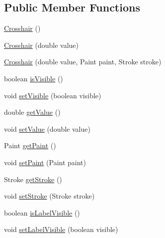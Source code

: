 \subsection*{Public Member Functions}
\begin{DoxyCompactItemize}
\item 
\mbox{\hyperlink{classorg_1_1jfree_1_1chart_1_1plot_1_1_crosshair_aec4cdb9ad9a929da083db1c1204e1cf8}{Crosshair}} ()
\item 
\mbox{\hyperlink{classorg_1_1jfree_1_1chart_1_1plot_1_1_crosshair_a75d72d1f061986df90c3a39cb1526309}{Crosshair}} (double value)
\item 
\mbox{\hyperlink{classorg_1_1jfree_1_1chart_1_1plot_1_1_crosshair_ac8ccc362ca329a1ff52f3f858b416de3}{Crosshair}} (double value, Paint paint, Stroke stroke)
\item 
boolean \mbox{\hyperlink{classorg_1_1jfree_1_1chart_1_1plot_1_1_crosshair_aebe636459c5fdca37f13bedfd0a070f8}{is\+Visible}} ()
\item 
void \mbox{\hyperlink{classorg_1_1jfree_1_1chart_1_1plot_1_1_crosshair_aa51f9dff848ea3bc68eb000379f41bd3}{set\+Visible}} (boolean visible)
\item 
double \mbox{\hyperlink{classorg_1_1jfree_1_1chart_1_1plot_1_1_crosshair_aa27be6dd0ed5c8fdf98c00a2e34c98e0}{get\+Value}} ()
\item 
void \mbox{\hyperlink{classorg_1_1jfree_1_1chart_1_1plot_1_1_crosshair_a8f53f7fe5b2f9f7ad0846a6b5f218079}{set\+Value}} (double value)
\item 
Paint \mbox{\hyperlink{classorg_1_1jfree_1_1chart_1_1plot_1_1_crosshair_a95c5923d9ef143cea6cdd735d43f420a}{get\+Paint}} ()
\item 
void \mbox{\hyperlink{classorg_1_1jfree_1_1chart_1_1plot_1_1_crosshair_a941b74a54828b6864ffd2557fcdc9ecd}{set\+Paint}} (Paint paint)
\item 
Stroke \mbox{\hyperlink{classorg_1_1jfree_1_1chart_1_1plot_1_1_crosshair_a41dcb9cd8c65d0630b74cd1488d0c4fd}{get\+Stroke}} ()
\item 
void \mbox{\hyperlink{classorg_1_1jfree_1_1chart_1_1plot_1_1_crosshair_afa44c3954b377eea8f5df66affefc242}{set\+Stroke}} (Stroke stroke)
\item 
boolean \mbox{\hyperlink{classorg_1_1jfree_1_1chart_1_1plot_1_1_crosshair_a57d3fed41cf715e092ccee249b19ee12}{is\+Label\+Visible}} ()
\item 
void \mbox{\hyperlink{classorg_1_1jfree_1_1chart_1_1plot_1_1_crosshair_ad7c7a7056ae228ddc663c8c7a64cedf2}{set\+Label\+Visible}} (boolean visible)
\item 

\end{DoxyCompactItemize}
